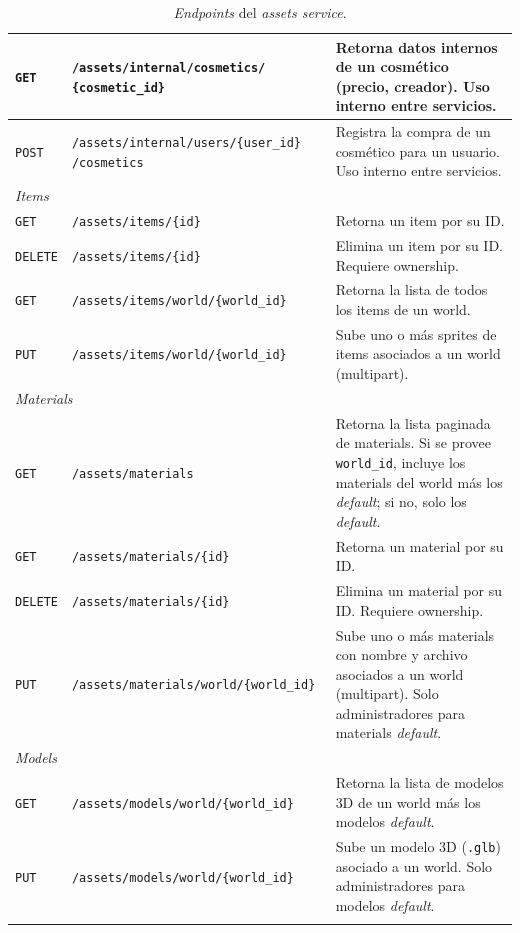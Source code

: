 \begin{longtable}{|p{2cm}|p{7cm}|p{5.5cm}|}
\hline
\texttt{GET}    & \texttt{/assets/internal/cosmetics/} \newline \texttt{\{cosmetic\_id\}} & Retorna datos internos de un cosmético (precio, creador). Uso interno entre servicios. \\
\hline
\texttt{POST}   & \texttt{/assets/internal/users/\{user\_id\}} \newline \texttt{/cosmetics} & Registra la compra de un cosmético para un usuario. Uso interno entre servicios. \\
\hline
\multicolumn{3}{|l|}{\textit{Items}} \\
\hline
\texttt{GET}    & \texttt{/assets/items/\{id\}}                                  & Retorna un item por su ID. \\
\hline
\texttt{DELETE} & \texttt{/assets/items/\{id\}}                                  & Elimina un item por su ID. Requiere ownership. \\
\hline
\texttt{GET}    & \texttt{/assets/items/world/\{world\_id\}}                     & Retorna la lista de todos los items de un world. \\
\hline
\texttt{PUT}    & \texttt{/assets/items/world/\{world\_id\}}                     & Sube uno o más sprites de items asociados a un world (multipart). \\
\hline
\multicolumn{3}{|l|}{\textit{Materials}} \\
\hline
\texttt{GET}    & \texttt{/assets/materials}                                     & Retorna la lista paginada de materials. Si se provee \texttt{world\_id}, incluye los materials del world más los \textit{default}; si no, solo los \textit{default}. \\
\hline
\texttt{GET}    & \texttt{/assets/materials/\{id\}}                              & Retorna un material por su ID. \\
\hline
\texttt{DELETE} & \texttt{/assets/materials/\{id\}}                              & Elimina un material por su ID. Requiere ownership. \\
\hline
\texttt{PUT}    & \texttt{/assets/materials/world/\{world\_id\}}                 & Sube uno o más materials con nombre y archivo asociados a un world (multipart). Solo administradores para materials \textit{default}. \\
\hline
\multicolumn{3}{|l|}{\textit{Models}} \\
\hline
\texttt{GET}    & \texttt{/assets/models/world/\{world\_id\}}                    & Retorna la lista de modelos 3D de un world más los modelos \textit{default}. \\
\hline
\texttt{PUT}    & \texttt{/assets/models/world/\{world\_id\}}                    & Sube un modelo 3D (\texttt{.glb}) asociado a un world. Solo administradores para modelos \textit{default}. \\
\hline
\caption{\textit{Endpoints} del \textit{assets service}.}\label{tab:assets-endpoints}
\end{longtable}
